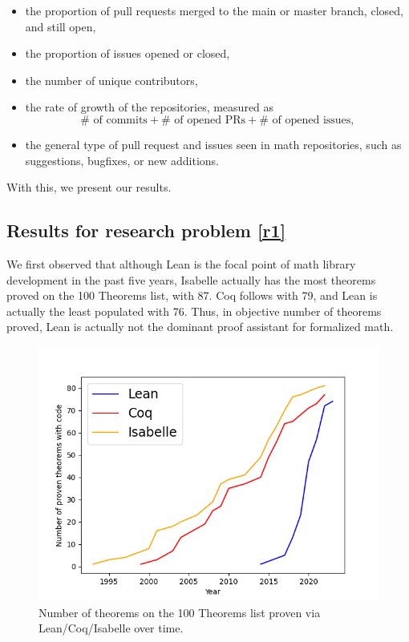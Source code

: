 \documentclass[sigconf,nonacm]{acmart}
\begin{document}
\begin{itemize}
 \item the proportion of pull requests merged to the main or master branch, closed, and still open,
 \item the proportion of issues opened or closed,
 \item the number of unique contributors,
 \item the rate of growth of the repositories, measured as
 \begin{equation}\label{eq1}
   \#\text{ of commits}+\#\text{ of opened PRs}+\#\text{ of opened issues},
 \end{equation}
 \item the general type of pull request and issues seen in math repositories, such as suggestions, bugfixes, or new additions.
\end{itemize}

With this, we present our results.

\subsection{Results for research problem \ref{r1}}

We first observed that although Lean is the focal point of math library development in the past five years, Isabelle actually has the most theorems proved on the 100 Theorems list, with 87. Coq follows with 79, and Lean is actually the least populated with 76. Thus, in objective number of theorems proved, Lean is actually not the dominant proof assistant for formalized math. 

\begin{figure}[H]
  \includegraphics[scale=0.5]{thm_dev.png}
  \caption{Number of theorems on the 100 Theorems list proven via Lean/Coq/Isabelle over time.}
  \label{thms over time}
\end{figure}
\end{document}
